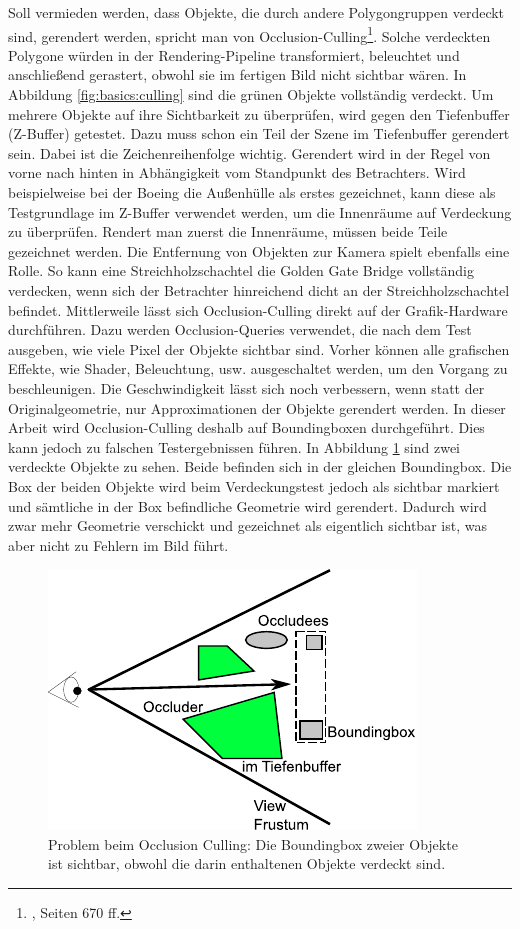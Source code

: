 Soll vermieden werden, dass Objekte, die durch andere Polygongruppen verdeckt sind, gerendert werden, spricht man von Occlusion-Culling\footnote{\cite{RTR3}, Seiten 670 ff.}. Solche verdeckten Polygone würden in der Rendering-Pipeline transformiert, beleuchtet und anschließend gerastert, obwohl sie im fertigen Bild nicht sichtbar wären. In Abbildung \ref{fig:basics:culling} sind die grünen Objekte vollständig verdeckt. Um mehrere Objekte auf ihre Sichtbarkeit zu überprüfen, wird gegen den Tiefenbuffer (Z-Buffer) getestet. Dazu muss schon ein Teil der Szene im Tiefenbuffer gerendert sein. Dabei ist die Zeichenreihenfolge wichtig. Gerendert wird in der Regel von vorne nach hinten in Abhängigkeit vom Standpunkt des Betrachters. Wird beispielweise bei der Boeing die Außenhülle als erstes gezeichnet, kann diese als Testgrundlage im Z-Buffer verwendet werden, um die Innenräume auf Verdeckung zu überprüfen. Rendert man zuerst die Innenräume, müssen beide Teile gezeichnet werden. Die Entfernung von Objekten zur Kamera spielt ebenfalls eine Rolle. So kann eine Streichholzschachtel die Golden Gate Bridge vollständig verdecken, wenn sich der Betrachter hinreichend dicht an der Streichholzschachtel befindet. Mittlerweile lässt sich Occlusion-Culling direkt auf der Grafik-Hardware durchführen. Dazu werden Occlusion-Queries verwendet, die nach dem Test ausgeben, wie viele Pixel der Objekte sichtbar sind. Vorher können alle grafischen Effekte, wie Shader, Beleuchtung, usw. ausgeschaltet werden, um den Vorgang zu beschleunigen. Die Geschwindigkeit lässt sich noch verbessern, wenn statt der Originalgeometrie, nur Approximationen der Objekte gerendert werden. In dieser Arbeit wird Occlusion-Culling deshalb auf Boundingboxen durchgeführt. Dies kann jedoch zu falschen Testergebnissen führen. In Abbildung \ref{fig:basics:oculling} sind zwei verdeckte Objekte zu sehen. Beide befinden sich in der gleichen Boundingbox. Die Box der beiden Objekte wird beim Verdeckungstest jedoch als sichtbar markiert und sämtliche in der Box befindliche Geometrie wird gerendert. Dadurch wird zwar mehr Geometrie verschickt und gezeichnet als eigentlich sichtbar ist, was aber nicht zu Fehlern im Bild führt.
\begin{figure}
  \centering
  \includegraphics[scale=0.8]{images/oculling.pdf}
  \caption{\label{fig:basics:oculling}Problem beim Occlusion Culling: Die Boundingbox zweier Objekte ist sichtbar, obwohl die darin enthaltenen Objekte verdeckt sind.}
  
\end{figure}

